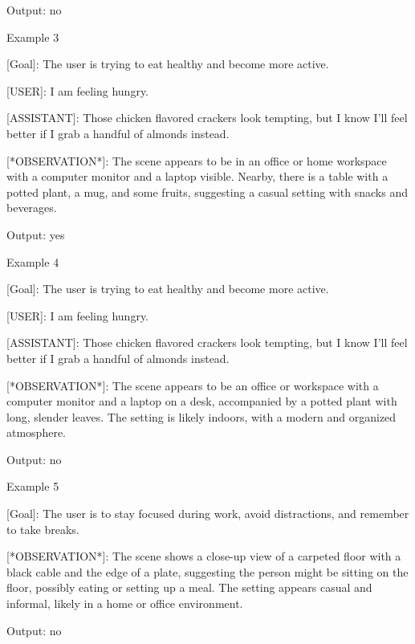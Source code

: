 Output: no

Example 3

[Goal]: The user is trying to eat healthy and become more active.

[USER]: I am feeling hungry.

[ASSISTANT]: Those chicken flavored crackers look tempting, but I know I'll feel better if I grab a handful of almonds instead.

[*OBSERVATION*]: The scene appears to be in an office or home workspace with a computer monitor and a laptop visible. Nearby, there is a table with a potted plant, a mug, and some fruits, suggesting a casual setting with snacks and beverages.

Output: yes

Example 4

[Goal]: The user is trying to eat healthy and become more active.

[USER]: I am feeling hungry.

[ASSISTANT]: Those chicken flavored crackers look tempting, but I know I'll feel better if I grab a handful of almonds instead.

[*OBSERVATION*]: The scene appears to be an office or workspace with a computer monitor and a laptop on a desk, accompanied by a potted plant with long, slender leaves. The setting is likely indoors, with a modern and organized atmosphere.

Output: no





Example 5

[Goal]: The user is to stay focused during work, avoid distractions, and remember to take breaks.

[*OBSERVATION*]: The scene shows a close-up view of a carpeted floor with a black cable and the edge of a plate, suggesting the person might be sitting on the floor, possibly eating or setting up a meal. The setting appears casual and informal, likely in a home or office environment.

Output: no

